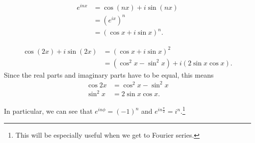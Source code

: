 \documentclass[10pt]{mypackage}
\begin{document}
\begin{theorem}[De Moivre]
\begin{align*}
  e^{inx} &= \cos\left(nx\right) + i\sin \left(nx\right)\\
          &= \left(e^{ix}\right)^{n}\\
          &= \left(\cos x + i\sin x\right)^n.
\end{align*}
\end{theorem}
\begin{example}
  \begin{align*}
    \cos\left(2x\right) + i\sin \left(2x\right) &= \left(\cos x + i\sin x\right)^2\\
                                                &= \left(\cos^2 x - \sin^2 x\right) + i\left(2\sin x \cos x\right).
  \end{align*}
  Since the real parts and imaginary parts have to be equal, this means
  \begin{align*}
    \cos 2x &= \cos^2 x - \sin^2 x\\
    \sin^2 x &= 2\sin x \cos x.
  \end{align*}
\end{example}
In particular, we can see that $e^{in\phi} = \left(-1\right)^n$ and $e^{in\frac{\pi}{2}} = i^n$.\footnote{This will be especially useful when we get to Fourier series.}\newline
\end{document}
